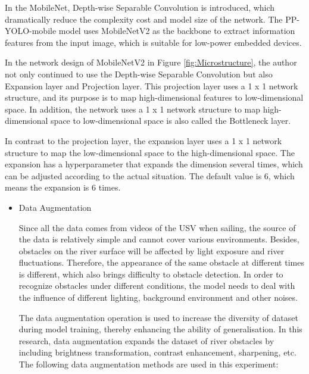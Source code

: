 \documentclass[sensors,article,submit,moreauthors,pdftex]{Definitions/mdpi}
\begin{document}
\begin{paracol}{2}
\begin{itemize}
In the MobileNet, Depth-wise Separable Convolution is introduced, which dramatically reduce the complexity cost and model size of the network. The PP-YOLO-mobile model uses MobileNetV2 as the backbone to extract information features from the input image, which is suitable for low-power embedded devices.



In the network design of MobileNetV2 in Figure \ref{fig:Microstructure}, the author not only continued to use the Depth-wise Separable Convolution but also Expansion layer and Projection layer. This projection layer uses a 1 x 1 network structure, and its purpose is to map high-dimensional features to low-dimensional space. In addition, the network uses a 1 x 1 network structure to map high-dimensional space to low-dimensional space is also called the Bottleneck layer.

In contrast to the projection layer, the expansion layer uses a 1 x 1 network structure to map the low-dimensional space to the high-dimensional space. The expansion has a hyperparameter that expands the dimension several times, which can be adjusted according to the actual situation. The default value is 6, which means the expansion is 6 times.



\end{itemize}

\begin{itemize}
\item{Data Augmentation}


Since all the data comes from videos of the USV when sailing, the source of the data is relatively simple and cannot cover various environments. Besides, obstacles on the river surface will be affected by light exposure and river fluctuations. Therefore, the appearance of the same obstacle at different times is different, which also brings difficulty to obstacle detection. In order to recognize obstacles under different conditions, the model needs to deal with the influence of different lighting, background environment and other noises.

The data augmentation operation is used to increase the diversity of dataset during model training, thereby enhancing the ability of generalisation. In this research, data augmentation expands the dataset of river obstacles by including brightness transformation, contrast enhancement, sharpening, etc. The following data augmentation methods are used in this experiment:




\end{itemize}
\end{paracol}
\end{document}
